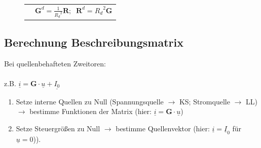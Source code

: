 \documentclass[a4paper,twocolumn,10pt]{article}
\begin{document}
\begin{figure}
\begin{tabular}{p{20mm}l}
& $\textbf{G}^d=\frac{1}{{R_d}^2}\textbf{R};\;\;\textbf{R}^d={R_d}^2\textbf{G}$
\end{tabular}
\end{figure}

\subsection*{Berechnung Beschreibungsmatrix}
Bei quellenbehafteten Zweitoren:\\\\
z.B. $\underline{i}=\textbf{G}\cdot \underline{u}+\underline{I_0}$
\begin{enumerate}
	\item Setze interne Quellen zu Null (Spannungsquelle $\rightarrow$ KS; Stromquelle $\rightarrow$ LL) $\rightarrow$ bestimme Funktionen der Matrix (hier: $\underline{i}=\textbf{G}\cdot \underline{u}$)
	\item Setze Steuergrößen zu Null $\rightarrow$ bestimme Quellenvektor (hier: $\underline{i}=\underline{I}_0$ für $\underline{u}=0$)).
\end{enumerate}
\end{document}
